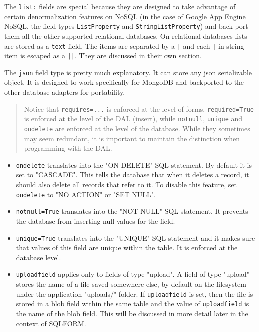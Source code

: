 \documentclass[justified,sixbynine,notoc]{tufte-book}
\def\ft{\small\tt}
\def\inxx#1{\index{#1}}
\begin{document}
\begin{fullwidth}
The {\ft list:} fields are special because they are designed to take advantage of certain denormalization features on NoSQL (in the case of Google App Engine NoSQL, the field types {\ft ListProperty} and {\ft StringListProperty}) and back-port them all the other supported relational databases. On relational databases lists are stored as a {\ft text} field. The items are separated by a {\ft |} and each {\ft |} in string item is escaped as a {\ft ||}. They are discussed in their own section.

The {\ft json} field type is pretty much explanatory. It can store any json serializable object. It is designed to work specifically for MongoDB and backported to the other database adapters for portability.

\begin{quote}Notice that {\ft requires=...} is enforced at the level of forms, {\ft required=True} is enforced at the level of the DAL (insert), while {\ft notnull}, {\ft unique} and {\ft ondelete} are enforced at the level of the database. While they sometimes may seem redundant, it is important to maintain the distinction when programming with the DAL.\end{quote}
\inxx{ondelete}

\begin{itemize}
\item {\ft ondelete} translates into the "ON DELETE" SQL statement. By default it is set to "CASCADE". This tells the database that when it deletes a record, it should also delete all records that refer to it. To disable this feature, set {\ft ondelete} to "NO ACTION" or "SET NULL".

\item {\ft notnull=True} translates into the "NOT NULL" SQL statement. It prevents the database from inserting null values for the field.

\item {\ft unique=True} translates into the "UNIQUE" SQL statement and it makes sure that values of this field are unique within the table. It is enforced at the database level.

\item {\ft uploadfield} applies only to fields of type "upload". A field of type "upload" stores the name of a file saved somewhere else, by default on the filesystem under the application "uploads/" folder. If {\ft uploadfield} is set, then the file is stored in a blob field within the same table and the value of {\ft uploadfield} is the name of the blob field. This will be discussed in more detail later in the context of SQLFORM.


\end{itemize}
\end{fullwidth}
\end{document}
